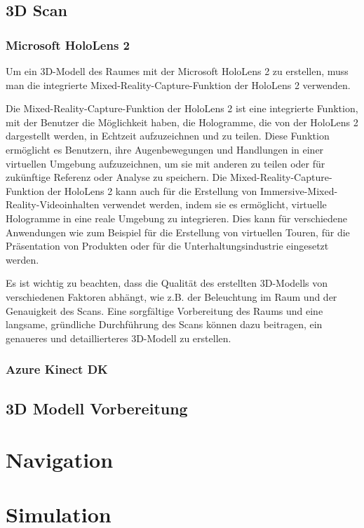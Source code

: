     \subsection{3D Scan}

        \subsubsection{Microsoft HoloLens 2}
        Um ein 3D-Modell des Raumes mit der Microsoft HoloLens 2 zu erstellen, muss man die integrierte Mixed-Reality-Capture-Funktion der HoloLens 2 verwenden.
        
        Die Mixed-Reality-Capture-Funktion der HoloLens 2 ist eine integrierte Funktion, mit der Benutzer die Möglichkeit haben, die Hologramme, die von der HoloLens 2 dargestellt werden, in Echtzeit aufzuzeichnen und zu teilen. Diese Funktion ermöglicht es Benutzern, ihre Augenbewegungen und Handlungen in einer virtuellen Umgebung aufzuzeichnen, um sie mit anderen zu teilen oder für zukünftige Referenz oder Analyse zu speichern. Die Mixed-Reality-Capture-Funktion der HoloLens 2 kann auch für die Erstellung von Immersive-Mixed-Reality-Videoinhalten verwendet werden, indem sie es ermöglicht, virtuelle Hologramme in eine reale Umgebung zu integrieren. Dies kann für verschiedene Anwendungen wie zum Beispiel für die Erstellung von virtuellen Touren, für die Präsentation von Produkten oder für die Unterhaltungsindustrie eingesetzt werden.
        

        Es ist wichtig zu beachten, dass die Qualität des erstellten 3D-Modells von verschiedenen Faktoren abhängt, wie z.B. der Beleuchtung im Raum und der Genauigkeit des Scans. Eine sorgfältige Vorbereitung des Raums und eine langsame, gründliche Durchführung des Scans können dazu beitragen, ein genaueres und detaillierteres 3D-Modell zu erstellen.
        \subsubsection{Azure Kinect \ac{DK}}

    \subsection{3D Modell Vorbereitung}

\section{Navigation}





\section{Simulation}



